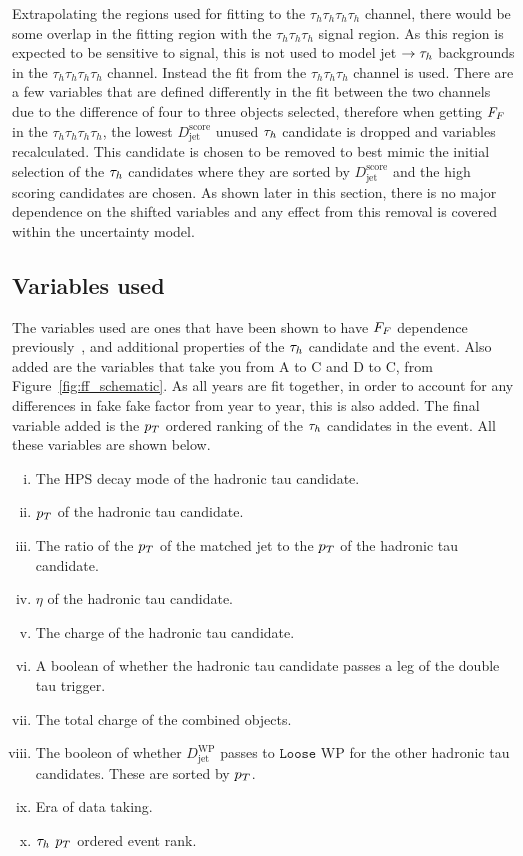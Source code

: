 Extrapolating the regions used for fitting to the $\tau_h \tau_h \tau_h \tau_h$ channel, there would be some overlap in the fitting region with the $\tau_h \tau_h \tau_h$ signal region. 
As this region is expected to be sensitive to signal, this is not used to model jet $\rightarrow\tau_{h}$ backgrounds in the $\tau_h \tau_h \tau_h \tau_h$ channel. 
Instead the fit from the $\tau_h \tau_h \tau_h$ channel is used. 
There are a few variables that are defined differently in the fit between the two channels due to the difference of four to three objects selected, therefore when getting $F_{F}$ in the $\tau_h \tau_h \tau_h \tau_h$, the lowest $D_{\text{jet}}^{\text{score}}$ unused $\tau_{h}$ candidate is dropped and variables recalculated. 
This candidate is chosen to be removed to best mimic the initial selection of the $\tau_{h}$ candidates where they are sorted by $D_{\text{jet}}^{\text{score}}$ and the high scoring candidates are chosen. 
As shown later in this section, there is no major dependence on the shifted variables and any effect from this removal is covered within the uncertainty model. \\

\subsection{Variables used}

The variables used are ones that have been shown to have $F_{F}$ dependence previously~\cite{CMS:2020rpr,CMS:2022rbd}, and additional properties of the $\tau_{h}$ candidate and the event. 
Also added are the variables that take you from A to C and D to C, from Figure~\ref{fig:ff_schematic}. 
As all years are fit together, in order to account for any differences in fake fake factor from year to year, this is also added. 
The final variable added is the $p_{T}$ ordered ranking of the $\tau_{h}$ candidates in the event.
All these variables are shown below.

\begin{enumerate}[i)]
\item The \ac{HPS} decay mode of the hadronic tau candidate.
\item $p_{T}$ of the hadronic tau candidate.
\item The ratio of the $p_{T}$  of the matched jet to the $p_{T}$ of the hadronic tau candidate.
\item $\eta$ of the hadronic tau candidate.
\item The charge of the hadronic tau candidate.
\item A boolean of whether the hadronic tau candidate passes a leg of the double tau trigger.
\item The total charge of the combined objects.
\item The booleon of whether $D_{\text{jet}}^{\text{WP}}$ passes to $\texttt{Loose}$ WP for the other hadronic tau candidates. These are sorted by $p_{T}$.
\item Era of data taking.
\item $\tau_{h}$ $p_{T}$ ordered event rank.
\end{enumerate}


